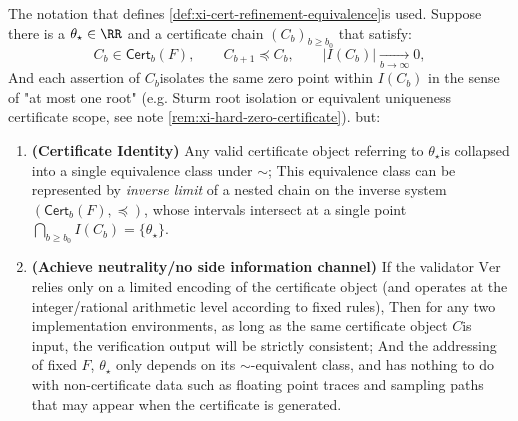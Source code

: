 \begin{theorem}\label{thm:xi-cert-inverse-limit-coherence}
The notation that defines \ref{def:xi-cert-refinement-equivalence} ​​is used.
Suppose there is a \(\theta_\star\in\RR\) ​​and a certificate chain \((C_b)_{b\ge b_0}\) that satisfy:
\[
C_{b}\in\mathsf{Cert}_b(F),\qquad C_{b+1}\preceq C_{b},\qquad \bigl|I(C_b)\bigr|\xrightarrow[b\to\infty]{}0,
\]
And each assertion of \(C_b\) ​​isolates the same zero point within \(I(C_b)\) in the sense of "at most one root" (e.g. Sturm root isolation or equivalent uniqueness certificate scope, see note \ref{rem:xi-hard-zero-certificate}).
but:
\begin{enumerate}
  \item \textbf{(Certificate Identity)} Any valid certificate object referring to \(\theta_\star\) ​​is collapsed into a single equivalence class under \(\sim\);
  This equivalence class can be represented by \emph{inverse limit} of a nested chain on the inverse system \((\mathsf{Cert}_b(F),\preceq)\), whose intervals intersect at a single point \(\bigcap_{b\ge b_0} I(C_b)=\{\theta_\star\}\).
  \item ​​\textbf{(Achieve neutrality/no side information channel)}
  If the validator \(\mathrm{Ver}\) ​​relies only on a limited encoding of the certificate object (and operates at the integer/rational arithmetic level according to fixed rules),
  Then for any two implementation environments, as long as the same certificate object \(C\) ​​is input, the verification output will be strictly consistent;
  And the addressing of fixed \(F\), \(\theta_\star\) only depends on its \(\sim\)-equivalent class, and has nothing to do with non-certificate data such as floating point traces and sampling paths that may appear when the certificate is generated.
\end{enumerate}
\end{theorem}

